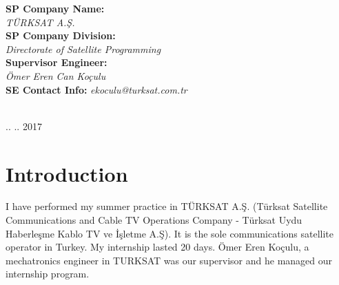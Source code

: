 \begin{titlepage}
\begin{minipage}{0.35\textwidth}
\begin{flushleft}
\end{flushleft}
\end{minipage}
\begin{minipage}{0.6\textwidth}
\begin{flushright} \large
\textbf{SP Company Name:} \\ 
 \textit{TÜRKSAT A.Ş.} \\
\textbf{SP Company Division:} \\ 
 \textit{Directorate of Satellite Programming} \\
\textbf{Supervisor Engineer:} \\
 \textit{Ömer Eren Can Koçulu} \\
\textbf{SE Contact Info:} 
 \textit{ekoculu@turksat.com.tr} 
\end{flushright}
\end{minipage}\\[1cm]



{\large .. .. 2017}\\[1cm] %


\vfill %

\end{titlepage}


\tableofcontents
\newpage



\section{Introduction}
\-
\indent I have performed my summer practice in TÜRKSAT A.Ş. (Türksat Satellite Communications and Cable TV Operations Company - Türksat Uydu Haberleşme Kablo TV ve İşletme A.Ş). It is the sole communications satellite operator in Turkey. My internship lasted 20 days. Ömer Eren Koçulu, a mechatronics engineer in TURKSAT was our supervisor and he managed our internship program. 

